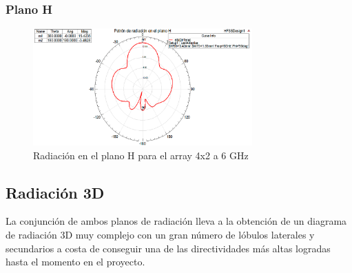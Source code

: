 \subsubsection{Plano H}
\begin{figure}[H]
    \centering
        \includegraphics[width=0.75\textwidth]{archivos/analisis/4x22/5}
        \caption{Radiación en el plano H para el array 4x2 a 6 GHz}
        \label{fig:H4x22}
\end{figure}

\subsection{Radiación 3D}
\par La conjunción de ambos planos de radiación lleva a la obtención de un diagrama de radiación 3D muy complejo con un gran número de lóbulos laterales y secundarios a costa de conseguir una de las directividades más altas logradas hasta el momento en el proyecto.

